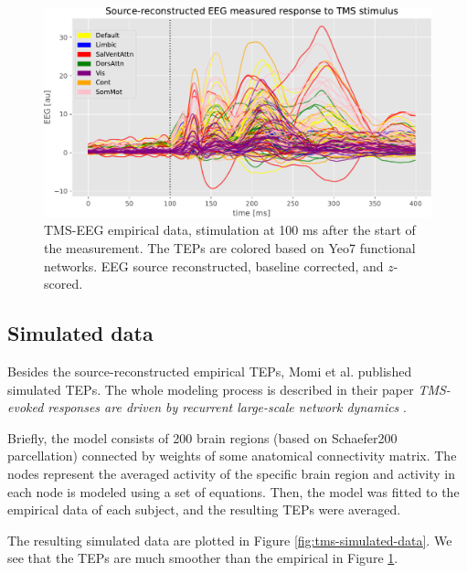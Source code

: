\begin{figure}
    \centering
    \includegraphics[width=\textwidth]{images/nootebook_generated/pytepfit_results/empirical/200/not_over_threshold_nan/data.pdf}
    \caption[TMS-EEG empirical data]{TMS-EEG empirical data, stimulation at 100 ms after the start of the measurement. The TEPs are colored based on Yeo7 functional networks. EEG source reconstructed, baseline corrected, and $z$-scored.}
    \label{fig:tms-empirical-data}
\end{figure}

\subsection{Simulated data}

Besides the source-reconstructed empirical TEPs, Momi et al. published simulated TEPs. The whole modeling process is described in their paper \textit{TMS-evoked responses are driven by recurrent large-scale network dynamics} \cite{momi_tms-evoked_2023}. 

Briefly, the model consists of 200 brain regions (based on Schaefer200 parcellation) connected by weights of some anatomical connectivity matrix. The nodes represent the averaged activity of the specific brain region and activity in each node is modeled using a set of equations. \cite{deco_perturbation_2018} Then, the model was fitted to the empirical data of each subject, and the resulting TEPs were averaged. \cite{momi_tms-evoked_2023}

The resulting simulated data are plotted in Figure \ref{fig:tms-simulated-data}. We see that the TEPs are much smoother than the empirical in Figure \ref{fig:tms-empirical-data}.

